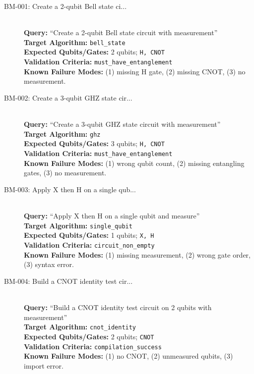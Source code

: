 \begin{description}
    \item[BM-001: Create a 2-qubit Bell state ci...] \ \\
    \textbf{Query:} ``Create a 2-qubit Bell state circuit with measurement'' \\
    \textbf{Target Algorithm:} \texttt{bell\_state} \\
    \textbf{Expected Qubits/Gates:} 2 qubits; \texttt{H, CNOT} \\
    \textbf{Validation Criteria:} \texttt{must\_have\_entanglement} \\
    \textbf{Known Failure Modes:} (1) missing H gate, (2) missing CNOT, (3) no measurement.

    \item[BM-002: Create a 3-qubit GHZ state cir...] \ \\
    \textbf{Query:} ``Create a 3-qubit GHZ state circuit with measurement'' \\
    \textbf{Target Algorithm:} \texttt{ghz} \\
    \textbf{Expected Qubits/Gates:} 3 qubits; \texttt{H, CNOT} \\
    \textbf{Validation Criteria:} \texttt{must\_have\_entanglement} \\
    \textbf{Known Failure Modes:} (1) wrong qubit count, (2) missing entangling gates, (3) no measurement.

    \item[BM-003: Apply X then H on a single qub...] \ \\
    \textbf{Query:} ``Apply X then H on a single qubit and measure'' \\
    \textbf{Target Algorithm:} \texttt{single\_qubit} \\
    \textbf{Expected Qubits/Gates:} 1 qubits; \texttt{X, H} \\
    \textbf{Validation Criteria:} \texttt{circuit\_non\_empty} \\
    \textbf{Known Failure Modes:} (1) missing measurement, (2) wrong gate order, (3) syntax error.

    \item[BM-004: Build a CNOT identity test cir...] \ \\
    \textbf{Query:} ``Build a CNOT identity test circuit on 2 qubits with measurement'' \\
    \textbf{Target Algorithm:} \texttt{cnot\_identity} \\
    \textbf{Expected Qubits/Gates:} 2 qubits; \texttt{CNOT} \\
    \textbf{Validation Criteria:} \texttt{compilation\_success} \\
    \textbf{Known Failure Modes:} (1) no CNOT, (2) unmeasured qubits, (3) import error.


\end{description}
